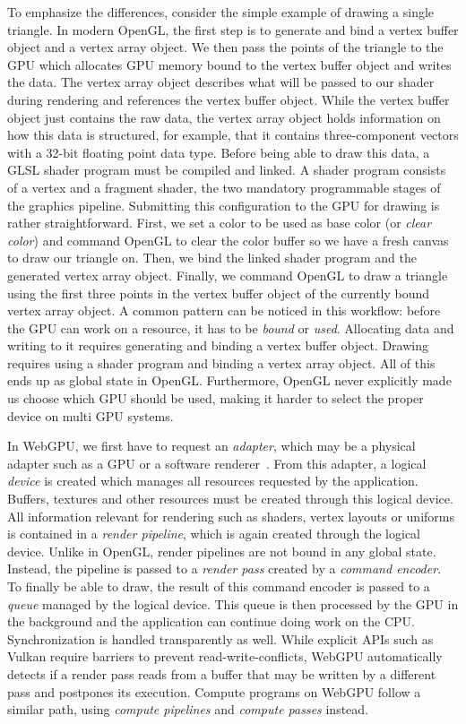 To emphasize the differences, consider the simple example of drawing a single triangle.
In modern OpenGL, the first step is to generate and bind a vertex buffer object and a vertex array object.
We then pass the points of the triangle to the GPU which allocates GPU memory bound to the vertex buffer object and writes the data.
The vertex array object describes what will be passed to our shader during rendering and references the vertex buffer object.
While the vertex buffer object just contains the raw data, the vertex array object holds information on how this data is structured, for example, that it contains three-component vectors with a 32-bit floating point data type.
Before being able to draw this data, a GLSL shader program must be compiled and linked.
A shader program consists of a vertex and a fragment shader, the two mandatory programmable stages of the graphics pipeline.
Submitting this configuration to the GPU for drawing is rather straightforward.
First, we set a color to be used as base color (or \emph{clear color}) and command OpenGL to clear the color buffer so we have a fresh canvas to draw our triangle on.
Then, we bind the linked shader program and the generated vertex array object.
Finally, we command OpenGL to draw a triangle using the first three points in the vertex buffer object of the currently bound vertex array object.
A common pattern can be noticed in this workflow: before the GPU can work on a resource, it has to be \emph{bound} or \emph{used}.
Allocating data and writing to it requires generating and binding a vertex buffer object.
Drawing requires using a shader program and binding a vertex array object.
All of this ends up as global state in OpenGL.
Furthermore, OpenGL never explicitly made us choose which GPU should be used, making it harder to select the proper device on multi GPU systems.

In WebGPU, we first have to request an \emph{adapter}, which may be a physical adapter such as a GPU or a software renderer~\cite{hansenLearnWgpu2021}.
From this adapter, a logical \emph{device} is created which manages all resources requested by the application.
Buffers, textures and other resources must be created through this logical device.
All information relevant for rendering such as shaders, vertex layouts or uniforms is contained in a \emph{render pipeline}, which is again created through the logical device.
Unlike in OpenGL, render pipelines are not bound in any global state.
Instead, the pipeline is passed to a \emph{render pass} created by a \emph{command encoder}.
To finally be able to draw, the result of this command encoder is passed to a \emph{queue} managed by the logical device.
This queue is then processed by the GPU in the background and the application can continue doing work on the CPU.
Synchronization is handled transparently as well.
While explicit APIs such as Vulkan require barriers to prevent read-write-conflicts, WebGPU automatically detects if a render pass reads from a buffer that may be written by a different pass and postpones its execution.
Compute programs on WebGPU follow a similar path, using \emph{compute pipelines} and \emph{compute passes} instead.

